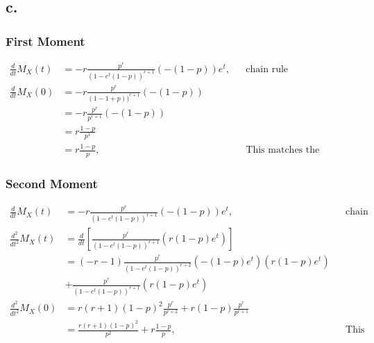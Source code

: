 \documentclass[12pt]{article}
\begin{document}
\subsection*{c.}

\subsubsection*{First Moment}
\begin{align*}
  \frac{d}{dt}M_X(t) &= -r\frac{p^r}{(1-e^{t}(1-p))^{r+1}}(-(1-p))e^t, & & \textrm{chain rule} \\
  \frac{d}{dt}M_X(0) &= -r\frac{p^r}{(1-1+p))^{r+1}}(-(1-p)) \\
  &= -r\frac{p^r}{p^{r+1}}(-(1-p)) \\
  &= r\frac{1-p}{p^1} \\
  &= r\frac{1-p}{p}, & & \textrm{This matches the answer from part A}
\end{align*}

\subsubsection*{Second Moment}
\begin{align*}
  \frac{d}{dt}M_X(t) &= -r\frac{p^r}{(1-e^{t}(1-p))^{r+1}}(-(1-p))e^t, & & \textrm{chain rule} \\
  \frac{d^2}{dt^2}M_X(t) 
  &= \frac{d}{dt}\left[\frac{p^r}{(1-e^{t}(1-p))^{r+1}}\left(r(1-p)e^t\right) \right] \\
  &= (-r-1)\frac{p^r}{(1-e^{t}(1-p))^{r+2}}(-(1-p)e^t)\left(r(1-p)e^t\right) \\
  &+ \frac{p^r}{(1-e^{t}(1-p))^{r+1}}\left(r(1-p)e^t\right) \\
  \frac{d^2}{dt^2}M_X(0) &= r(r+1)(1-p)^2\frac{p^r}{p^{r+2}}
  + r(1-p)\frac{p^r}{p^{r+1}} \\
  &= \frac{r(r+1)(1-p)^2}{p^2} + r\frac{1-p}{p}, & & \textrm{This matches the answer from part A}
\end{align*}
\end{document}
